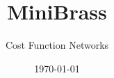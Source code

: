 \documentclass[handout,10pt,xcolor={dvipsnames},fleqn]{beamer}
\title{MiniBrass}
\author{Cost Function Networks}
\date{\today}
\newcommand{\cemph}[1]{\alert{#1}}
\begin{document}
\titleframe

%
%
%
%
%
%
%
%
%
%
%
%
%
\end{document}

